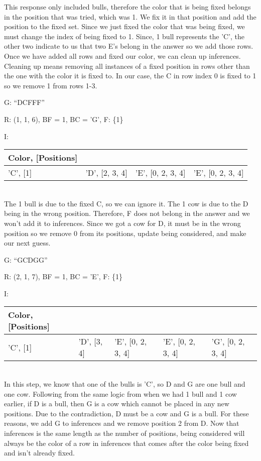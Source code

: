 \documentclass[11pt]{article}
\begin{document}
    This response only included bulls, therefore the color that is being fixed belongs in the position that was tried, which was 1. We fix it in that position and add the position to the fixed set. Since we just fixed the color that was being fixed, we must change the index of being fixed to 1. Since, 1 bull represents the 'C', the other two indicate to us that two E's belong in the answer so we add those rows. Once we have added all rows and fixed our color, we can clean up inferences. Cleaning up means removing all instances of a fixed position in rows other than the one with the color it is fixed to. In our case, the C in row index 0 is fixed to 1 so we remove 1 from rows 1-3.

    \noindent G: \enquote{DCFFF}
    
    \noindent R: (1, 1, 6), BF = 1, BC = 'G', F: \{1\}

    \noindent I: \begin{tabularx}{.85\textwidth}{|X|X|X|X|}
        \hline
        Color, [Positions]&&&\\\hline 
        'C', [1]&'D', [2, 3, 4]&'E', [0, 2, 3, 4]&'E', [0, 2, 3, 4]\\\hline
    \end{tabularx}\\

    The 1 bull is due to the fixed C, so we can ignore it. The 1 cow is due to the D being in the wrong position. Therefore, F does not belong in the answer and we won't add it to inferences. Since we got a cow for D, it must be in the wrong position so we remove 0 from its positions, update being considered, and make our next guess.

    \noindent G: \enquote{GCDGG}

    \noindent R: (2, 1, 7), BF = 1, BC = 'E', F: \{1\}

    \noindent I: \begin{tabularx}{\textwidth}{|X|X|X|X|X|}
        \hline
        Color, [Positions]&&&&\\\hline 
        'C', [1]&'D', [3, 4]&'E', [0, 2, 3, 4]&'E', [0, 2, 3, 4]&'G', [0, 2, 3, 4]\\\hline
    \end{tabularx}\\

    In this step, we know that one of the bulls is 'C', so D and G are one bull and one cow. Following from the same logic from when we had 1 bull and 1 cow earlier, if D is a bull, then G is a cow which cannot be placed in any new positions. Due to the contradiction, D must be a cow and G is a bull. For these reasons, we add G to inferences and we remove position 2 from D. Now that inferences is the same length as the number of positions, being considered will always be the color of a row in inferences that comes after the color being fixed and isn't already fixed.
    
\end{document}
